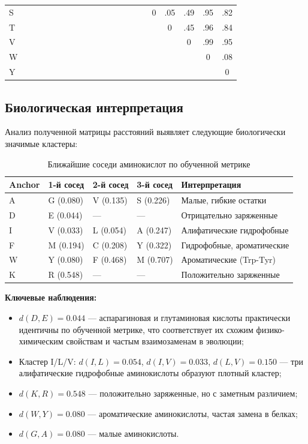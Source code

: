 \documentclass[12pt]{article}
\begin{document}
\begin{table}[h]
\begin{tabular}{lcccccccccccccccccccc}
S &   &   &   &   &   &   &   &   &   &   &   &   &   &   &   & 0 & .05 & .49 & .95 & .82 \\
T &   &   &   &   &   &   &   &   &   &   &   &   &   &   &   &   & 0 & .45 & .96 & .84 \\
V &   &   &   &   &   &   &   &   &   &   &   &   &   &   &   &   &   & 0 & .99 & .95 \\
W &   &   &   &   &   &   &   &   &   &   &   &   &   &   &   &   &   &   & 0 & .08 \\
Y &   &   &   &   &   &   &   &   &   &   &   &   &   &   &   &   &   &   &   & 0 \\
\bottomrule
\end{tabular}
\end{table}

\subsection{Биологическая интерпретация}

Анализ полученной матрицы расстояний выявляет следующие биологически значимые кластеры:

\begin{table}[h]
\centering
\caption{Ближайшие соседи аминокислот по обученной метрике}
\label{tab:neighbors}
\begin{tabular}{lp{3cm}p{2.5cm}p{2.5cm}p{4cm}}
\toprule
\textbf{Anchor} & \textbf{1-й сосед} & \textbf{2-й сосед} & \textbf{3-й сосед} & \textbf{Интерпретация} \\
\midrule
A & G (0.080) & V (0.135) & S (0.226) & Малые, гибкие остатки \\
D & E (0.044) & --- & --- & Отрицательно заряженные \\
I & V (0.033) & L (0.054) & A (0.247) & Алифатические гидрофобные \\
F & M (0.194) & C (0.208) & Y (0.322) & Гидрофобные, ароматические \\
W & Y (0.080) & F (0.468) & M (0.707) & Ароматические (Trp-Tyr) \\
K & R (0.548) & --- & --- & Положительно заряженные \\
\bottomrule
\end{tabular}
\end{table}

\textbf{Ключевые наблюдения:}
\begin{itemize}
    \item $d(D,E) = 0.044$ --- аспарагиновая и глутаминовая кислоты практически идентичны по обученной метрике, что соответствует их схожим физико-химическим свойствам и частым взаимозаменам в эволюции;
    \item Кластер I/L/V: $d(I,L) = 0.054$, $d(I,V) = 0.033$, $d(L,V) = 0.150$ --- три алифатические гидрофобные аминокислоты образуют плотный кластер;
    \item $d(K,R) = 0.548$ --- положительно заряженные, но с заметным различием;
    \item $d(W,Y) = 0.080$ --- ароматические аминокислоты, частая замена в белках;
    \item $d(G,A) = 0.080$ --- малые аминокислоты.
\end{itemize}
\end{document}
